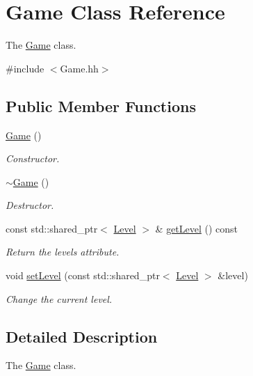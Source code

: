 \hypertarget{classGame}{}\section{Game Class Reference}
\label{classGame}


The \hyperlink{classGame}{Game} class.  




{\ttfamily \#include $<$Game.\+hh$>$}

\subsection*{Public Member Functions}
\begin{DoxyCompactItemize}
\item 
\mbox{\label{classGame_ad59df6562a58a614fda24622d3715b65}} 
\hyperlink{classGame_ad59df6562a58a614fda24622d3715b65}{Game} ()
\begin{DoxyCompactList}\small\item\em Constructor. \end{DoxyCompactList}\item 
\mbox{\label{classGame_ae3d112ca6e0e55150d2fdbc704474530}} 
\hyperlink{classGame_ae3d112ca6e0e55150d2fdbc704474530}{$\sim$\+Game} ()
\begin{DoxyCompactList}\small\item\em Destructor. \end{DoxyCompactList}\item 
const std\+::shared\+\_\+ptr$<$ \hyperlink{classLevel}{Level} $>$ \& \hyperlink{classGame_aad97bed9ceadea4fcf802feaebc66947}{get\+Level} () const
\begin{DoxyCompactList}\small\item\em Return the level\textquotesingle{}s attribute. \end{DoxyCompactList}\item 
void \hyperlink{classGame_a9b3ac5684d403e8b6ecdc83f268c420f}{set\+Level} (const std\+::shared\+\_\+ptr$<$ \hyperlink{classLevel}{Level} $>$ \&level)
\begin{DoxyCompactList}\small\item\em Change the current level. \end{DoxyCompactList}\end{DoxyCompactItemize}


\subsection{Detailed Description}
The \hyperlink{classGame}{Game} class. 

